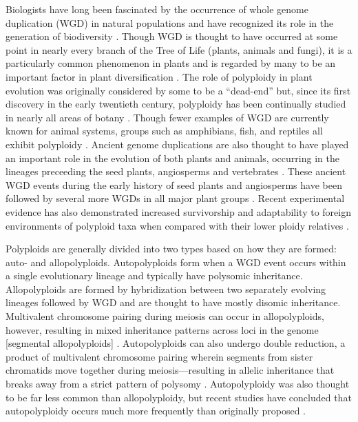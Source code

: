 \documentclass[11pt,english,letterpaper,oneside]{article}
\begin{document}
Biologists have long been fascinated by the occurrence of whole genome duplication (WGD) in natural populations and have recognized its role in the generation of biodiversity \citep{ClausKeckHies1940,StebbinsVariationEvolution,GrantPlantSpeciation,otto2000polyploidy}. Though WGD is thought to have occurred at some point in nearly every branch of the Tree of Life (plants, animals and fungi), it is a particularly common phenomenon in plants and is regarded by many to be an important factor in plant diversification \citep{wood2009polyploid,soltisd2009diversification,scarpino2014polyploid}. The role of polyploidy in plant evolution was originally considered by some to be a ``dead-end'' \citep{StebbinsVariationEvolution,wagner1970noise,soltisd2014stebbins} but, since its first discovery in the early twentieth century, polyploidy has been continually studied in nearly all areas of botany \citep{winge1917polyploidy,Winkler1916polyploidy,ClausKeckHies1945polyploidy,GrantPlantSpeciation,StebbinsVariationEvolution,soltisD2003polyploid,soltisd2010polyploidUnknowns,soltai2009roleOfHybridization,ramsey2014polEcoProcRoySoc}. Though fewer examples of WGD are currently known for animal systems, groups such as amphibians, fish, and reptiles all exhibit polyploidy \citep{allendorf1984tetraploidFish,gregory2005polyploidyAnimals}. Ancient genome duplications are also thought to have played an important role in the evolution of both plants and animals, occurring in the lineages preceeding the seed plants, angiosperms and vertebrates \citep{ohno1970geneDuplication,otto2000polyploidy,furlong2001animalOctoploid,jiao2011ancientWGD}. These ancient WGD events during the early history of seed plants and angiosperms have been followed by several more WGDs in all major plant groups \citep{cui2006genomeDuplication,scarpino2014polyploid,canon2014polyploidyLegumes}. Recent experimental evidence has also demonstrated increased survivorship and adaptability to foreign environments of polyploid taxa when compared with their lower ploidy relatives \citep{ramsey2011polyploidEcology,Selmecki2015yeastAdaptation}.
\medskip

Polyploids are generally divided into two types based on how they are formed: auto- and allopolyploids. Autopolyploids form when a WGD event occurs within a single evolutionary lineage and typically have polysomic inheritance. Allopolyploids are formed by hybridization between two separately evolving lineages followed by WGD and are thought to have mostly disomic inheritance. Multivalent chromosome pairing during meiosis can occur in allopolyploids, however, resulting in mixed inheritance patterns across loci in the genome [segmental allopolyploids] \citep{StebbinsVariationEvolution}. Autopolyploids can also undergo double reduction, a product of multivalent chromosome pairing wherein segments from sister chromatids move together during meiosis---resulting in allelic inheritance that breaks away from a strict pattern of polysomy \citep{haldane1930autopolyploids}. Autopolyploidy was also thought to be far less common than allopolyploidy, but recent studies have concluded that autopolyploidy occurs much more frequently than originally proposed \citep{soltis2007autopolyploidy,parisod2010autopolyploidy}.
\medskip
\end{document}
